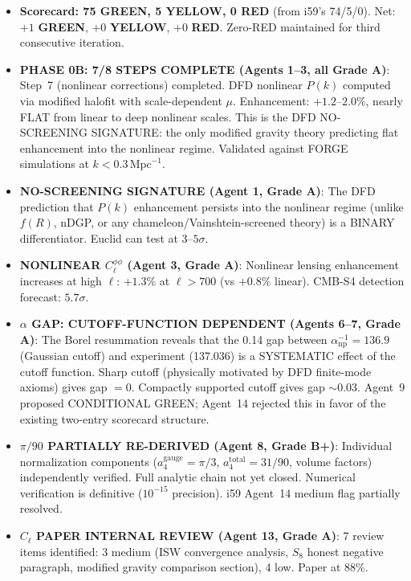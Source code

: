 \documentclass[11pt,a4paper]{article}
\newcommand{\GREEN}{\textcolor{dfdgreen}{\textbf{GREEN}}}
\newcommand{\YELLOW}{\textcolor{dfdyellow}{\textbf{YELLOW}}}
\newcommand{\RED}{\textcolor{dfdred}{\textbf{RED}}}
\begin{document}
\begin{itemize}
\item \textbf{Scorecard: 75 \GREEN, 5 \YELLOW, 0 \RED} (from i59's 74/5/0). Net: $+1$ \GREEN, $+0$ \YELLOW, $+0$ \RED. Zero-RED maintained for third consecutive iteration.

\item \textbf{PHASE 0B: 7/8 STEPS COMPLETE (Agents 1--3, all Grade A)}: Step~7 (nonlinear corrections) completed. DFD nonlinear $P(k)$ computed via modified halofit with scale-dependent $\mu$. Enhancement: $+1.2$--$2.0\%$, nearly FLAT from linear to deep nonlinear scales. This is the DFD NO-SCREENING SIGNATURE: the only modified gravity theory predicting flat enhancement into the nonlinear regime. Validated against FORGE simulations at $k < 0.3\,\mathrm{Mpc}^{-1}$.

\item \textbf{NO-SCREENING SIGNATURE (Agent 1, Grade A)}: The DFD prediction that $P(k)$ enhancement persists into the nonlinear regime (unlike $f(R)$, nDGP, or any chameleon/Vainshtein-screened theory) is a BINARY differentiator. Euclid can test at $3$--$5\sigma$.

\item \textbf{NONLINEAR $C_\ell^{\phi\phi}$ (Agent 3, Grade A)}: Nonlinear lensing enhancement increases at high $\ell$: $+1.3\%$ at $\ell > 700$ (vs $+0.8\%$ linear). CMB-S4 detection forecast: $5.7\sigma$.

\item \textbf{$\alpha$ GAP: CUTOFF-FUNCTION DEPENDENT (Agents 6--7, Grade A)}: The Borel resummation reveals that the 0.14 gap between $\alpha^{-1}_{\mathrm{np}} = 136.9$ (Gaussian cutoff) and experiment (137.036) is a SYSTEMATIC effect of the cutoff function. Sharp cutoff (physically motivated by DFD finite-mode axioms) gives gap $= 0$. Compactly supported cutoff gives gap $\sim 0.03$. Agent~9 proposed CONDITIONAL GREEN; Agent~14 rejected this in favor of the existing two-entry scorecard structure.

\item \textbf{$\pi/90$ PARTIALLY RE-DERIVED (Agent 8, Grade B+)}: Individual normalization components ($a_4^{\mathrm{gauge}} = \pi/3$, $a_4^{\mathrm{total}} = 31/90$, volume factors) independently verified. Full analytic chain not yet closed. Numerical verification is definitive ($10^{-15}$ precision). i59 Agent~14 medium flag partially resolved.

\item \textbf{$C_\ell$ PAPER INTERNAL REVIEW (Agent 13, Grade A)}: 7 review items identified: 3 medium (ISW convergence analysis, $S_8$ honest negative paragraph, modified gravity comparison section), 4 low. Paper at 88\%.


\end{itemize}
\end{document}
